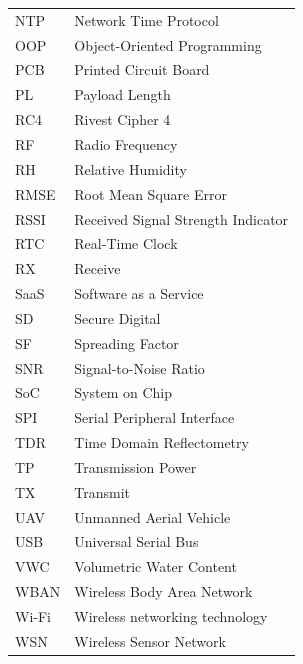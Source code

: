 \begin{longtable}{@{}p{}p{}@{}}
NTP & Network Time Protocol\\
OOP & Object-Oriented Programming\\
PCB & Printed Circuit Board\\
PL & Payload Length\\
RC4 & Rivest Cipher 4\\
RF & Radio Frequency\\
RH & Relative Humidity\\
RMSE & Root Mean Square Error\\
RSSI & Received Signal Strength Indicator\\
RTC & Real-Time Clock\\
RX & Receive\\
SaaS & Software as a Service\\
SD & Secure Digital\\
SF & Spreading Factor\\
SNR & Signal-to-Noise Ratio\\
SoC & System on Chip\\
SPI & Serial Peripheral Interface\\
TDR & Time Domain Reflectometry\\
TP & Transmission Power\\
TX & Transmit\\
UAV & Unmanned Aerial Vehicle\\
USB & Universal Serial Bus\\
VWC & Volumetric Water Content\\
WBAN & Wireless Body Area Network\\
Wi-Fi & Wireless networking technology\\
WSN & Wireless Sensor Network\\
\end{longtable}
\endgroup
